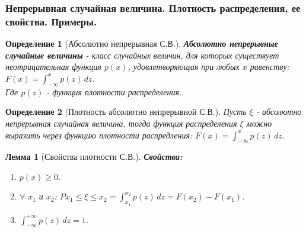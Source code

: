 \documentclass[14pt]{extarticle}
\theoremstyle{breakstyle}
\newtheorem{definition}{Определение}[subsection]
\newtheorem{lemma}{Лемма}[subsection]
\begin{document}
\subsubsection{Непрерывная случайная величина. Плотность распределения, ее свойства. Примеры.}
\begin{definition}[Абсолютно непрерывная С.В.]

\textbf{Абсолютно непрерывные случайные величины} - класс случайных величин, для которых существует неотрицательная функция $p(x)$, удовлетворяющая при любых $x$ равенству: $F(x) = \int_{-\infty}^{x}p(z) \, dz$. \\
Где $p(z)$ - функция плотности распределения.

\end{definition}

\begin{definition}[Плотность абсолютно непрерывной С.В.]

Пусть $\xi$ - абсолютно непрерывная случайная величина, тогда функция распределения $\xi$ можно выразить через функцию плотности распредления: $F(x) = \int_{-\infty}^{x}p(z) \, dz$.

\end{definition}

\begin{lemma}[Свойства плотности С.В.]

\textbf{Свойства:}
\begin{enumerate}
    \item $p(x) \geq 0$.
    \item $\forall$ $x_{1}$ и $x_{2}$: $P{x_{1} \leq \xi \leq x_{2}} = \int_{x_{1}}^{x_2} p(z) \, dz = F(x_{2}) - F(x_{1})$.
    \item $\int_{-\infty}^{+\infty}p(z) \, dz = 1$.
\end{enumerate}

\end{lemma}
\end{document}
